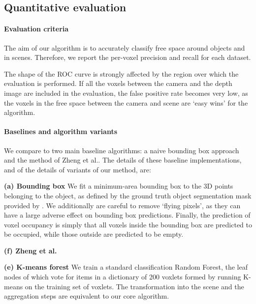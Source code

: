 \documentclass[10pt,twocolumn,letterpaper]{article}
\makeatletter
\newcommand*{\ea}{et al.\@\xspace}
\makeatother
\begin{document}
\subsection{Quantitative evaluation}

\paragraph{Evaluation criteria}
The aim of our algorithm is to accurately classify free space around objects and in scenes.
Therefore, we report the per-voxel precision and recall for each dataset.

The shape of the ROC curve is strongly affected by the region over which the evaluation is performed.
If all the voxels between the camera and the depth image are included in the evaluation, the false positive rate becomes very low, as the voxels in the free space between the camera and scene are `easy wins' for the algorithm. 


\paragraph{Baselines and algorithm variants}
\label{sec:algorithms}
We compare to two main baseline algorithms: a naive bounding box approach and the method of Zheng \ea \cite{zheng-cvpr-2013}.
The details of these baseline implementations, and of the details of variants of our method, are:

\noindent \textbf{(a) Bounding box} We fit a minimum-area bounding box to the 3D points belonging to the object, as defined by the ground truth object segmentation mask provided by \cite{singh-icra-2014}.
We additionally are careful to remove `flying pixels', as they can have a large adverse effect on bounding box predictions.
Finally, the prediction of voxel occupancy is simply that all voxels inside the bounding box are predicted to be occupied, while those outside are predicted to be empty.

\noindent \textbf{(f) Zheng \ea} \cite{zheng-cvpr-2013}

\noindent \textbf{(e) K-means forest} We train a standard classification Random Forest, the leaf nodes of which vote for items in a dictionary of 200 voxlets formed by running K-means on the training set of voxlets. The transformation into the scene and the aggregation steps are equivalent to our core algorithm.
\end{document}
